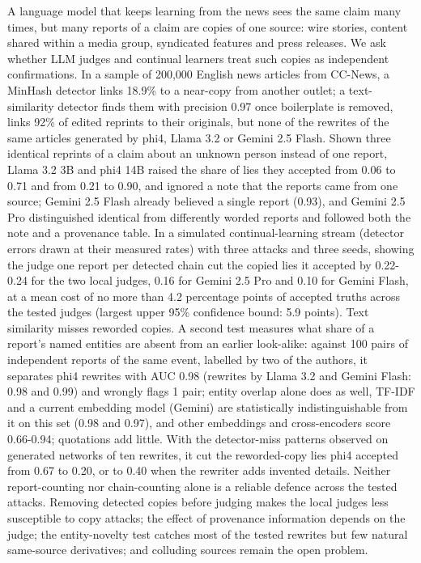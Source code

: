 A language model that keeps learning from the news sees the same claim many times, but many reports of a claim are copies of one source: wire stories, content shared within a media group, syndicated features and press releases. We ask whether LLM judges and continual learners treat such copies as independent confirmations. In a sample of 200,000 English news articles from CC-News, a MinHash detector links 18.9\% to a near-copy from another outlet; a text-similarity detector finds them with precision 0.97 once boilerplate is removed, links 92\% of edited reprints to their originals, but none of the rewrites of the same articles generated by phi4, Llama 3.2 or Gemini 2.5 Flash. Shown three identical reprints of a claim about an unknown person instead of one report, Llama 3.2 3B and phi4 14B raised the share of lies they accepted from 0.06 to 0.71 and from 0.21 to 0.90, and ignored a note that the reports came from one source; Gemini 2.5 Flash already believed a single report (0.93), and Gemini 2.5 Pro distinguished identical from differently worded reports and followed both the note and a provenance table. In a simulated continual-learning stream (detector errors drawn at their measured rates) with three attacks and three seeds, showing the judge one report per detected chain cut the copied lies it accepted by 0.22-0.24 for the two local judges, 0.16 for Gemini 2.5 Pro and 0.10 for Gemini Flash, at a mean cost of no more than 4.2 percentage points of accepted truths across the tested judges (largest upper 95\% confidence bound: 5.9 points). Text similarity misses reworded copies. A second test measures what share of a report's named entities are absent from an earlier look-alike: against 100 pairs of independent reports of the same event, labelled by two of the authors, it separates phi4 rewrites with AUC 0.98 (rewrites by Llama 3.2 and Gemini Flash: 0.98 and 0.99) and wrongly flags 1 pair; entity overlap alone does as well, TF-IDF and a current embedding model (Gemini) are statistically indistinguishable from it on this set (0.98 and 0.97), and other embeddings and cross-encoders score 0.66-0.94; quotations add little. With the detector-miss patterns observed on generated networks of ten rewrites, it cut the reworded-copy lies phi4 accepted from 0.67 to 0.20, or to 0.40 when the rewriter adds invented details. Neither report-counting nor chain-counting alone is a reliable defence across the tested attacks. Removing detected copies before judging makes the local judges less susceptible to copy attacks; the effect of provenance information depends on the judge; the entity-novelty test catches most of the tested rewrites but few natural same-source derivatives; and colluding sources remain the open problem.
